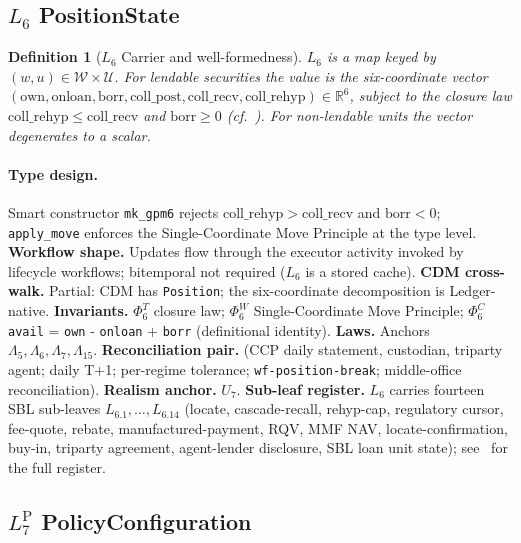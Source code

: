 \documentclass[11pt,a4paper]{article}
\newtheorem{definition}{Definition}[section]
\begin{document}
\subsection{$L_6$ PositionState}
\label{sec:leaf-l6}

\begin{definition}[$L_6$ Carrier and well-formedness]
$L_6$ is a map keyed by $(w, u) \in \mathcal{W} \times \mathcal{U}$. For lendable securities the value is the six-coordinate vector $(\mathrm{own}, \mathrm{onloan}, \mathrm{borr}, \mathrm{coll\_post}, \mathrm{coll\_recv}, \mathrm{coll\_rehyp}) \in \mathbb{R}^6$, subject to the closure law $\mathrm{coll\_rehyp} \le \mathrm{coll\_recv}$ and $\mathrm{borr} \ge 0$ (cf.~\cite[\S Generalised Position Model]{ledger}). For non-lendable units the vector degenerates to a scalar.
\end{definition}

\paragraph{Type design.} Smart constructor \texttt{mk\_gpm6} rejects $\mathrm{coll\_rehyp} > \mathrm{coll\_recv}$ and $\mathrm{borr} < 0$; \texttt{apply\_move} enforces the Single-Coordinate Move Principle at the type level. \textbf{Workflow shape.} Updates flow through the executor activity invoked by lifecycle workflows; bitemporal not required ($L_6$ is a stored cache). \textbf{CDM cross-walk.} Partial: CDM has \texttt{Position}; the six-coordinate decomposition is Ledger-native. \textbf{Invariants.} $\Phi_6^T$ closure law; $\Phi_6^W$ Single-Coordinate Move Principle; $\Phi_6^C$ \texttt{avail} = \texttt{own} - \texttt{onloan} + \texttt{borr} (definitional identity). \textbf{Laws.} Anchors $\Lambda_5, \Lambda_6, \Lambda_7, \Lambda_{15}$. \textbf{Reconciliation pair.} (CCP daily statement, custodian, triparty agent; daily T+1; per-regime tolerance; \texttt{wf-position-break}; middle-office reconciliation). \textbf{Realism anchor.} $U_7$. \textbf{Sub-leaf register.} $L_6$ carries fourteen SBL sub-leaves $L_{6.1},\dots,L_{6.14}$ (locate, cascade-recall, rehyp-cap, regulatory cursor, fee-quote, rebate, manufactured-payment, RQV, MMF NAV, locate-confirmation, buy-in, triparty agreement, agent-lender disclosure, SBL loan unit state); see~\cite[\S SBL]{ledger} for the full register.

\subsection{$L_7^{\mathrm{P}}$ PolicyConfiguration}
\label{sec:leaf-l7p}
\end{document}
